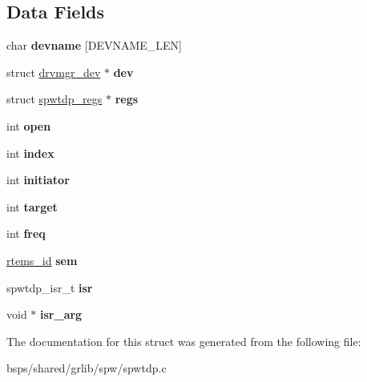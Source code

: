 \subsection*{Data Fields}
\begin{DoxyCompactItemize}
\item 
\mbox{\label{structspwtdp__priv_a8e042f00bd1ea6b5874e6e30e71c29e1}} 
char {\bfseries devname} \mbox{[}D\+E\+V\+N\+A\+M\+E\+\_\+\+L\+EN\mbox{]}
\item 
\mbox{\label{structspwtdp__priv_a3be889ca412af004de8b5e999625e3f7}} 
struct \mbox{\hyperlink{structdrvmgr__dev}{drvmgr\+\_\+dev}} $\ast$ {\bfseries dev}
\item 
\mbox{\label{structspwtdp__priv_ab4d76ef5aec9463ad77988981b7e0fc0}} 
struct \mbox{\hyperlink{structspwtdp__regs}{spwtdp\+\_\+regs}} $\ast$ {\bfseries regs}
\item 
\mbox{\label{structspwtdp__priv_ae0793e32833b3a36fa1c47717ef645aa}} 
int {\bfseries open}
\item 
\mbox{\label{structspwtdp__priv_a14425d3c6da1c32310ddca233070ab66}} 
int {\bfseries index}
\item 
\mbox{\label{structspwtdp__priv_afa2b5ad27d9f4f9031936edefaf1ac15}} 
int {\bfseries initiator}
\item 
\mbox{\label{structspwtdp__priv_a7691b64d380e801130d178ef1d9f12a6}} 
int {\bfseries target}
\item 
\mbox{\label{structspwtdp__priv_a7f3504671b291f29e60fdea7a0dd6102}} 
int {\bfseries freq}
\item 
\mbox{\label{structspwtdp__priv_ac2dad7cdbf3001f151afcc3b8572b922}} 
\mbox{\hyperlink{group__ClassicTasks_gab20892b814dced7dd4e5b9bf42becd57}{rtems\+\_\+id}} {\bfseries sem}
\item 
\mbox{\label{structspwtdp__priv_abab6214ce4ea02576987cc99df1e0dcc}} 
spwtdp\+\_\+isr\+\_\+t {\bfseries isr}
\item 
\mbox{\label{structspwtdp__priv_a683ef50828b01dd925de0fb81adfd9e6}} 
void $\ast$ {\bfseries isr\+\_\+arg}
\end{DoxyCompactItemize}


The documentation for this struct was generated from the following file\+:\begin{DoxyCompactItemize}
\item 
bsps/shared/grlib/spw/spwtdp.\+c\end{DoxyCompactItemize}
